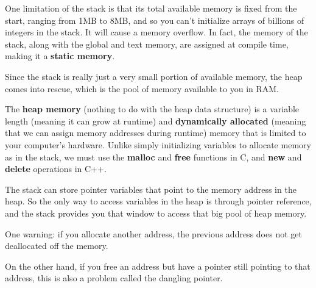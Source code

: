 \documentclass{article}
\begin{document}
    One limitation of the stack is that its total available memory is fixed from the start, ranging from 1MB to 8MB, and so you can't initialize arrays of billions of integers in the stack. It will cause a memory overflow. In fact, the memory of the stack, along with the global and text memory, are assigned at compile time, making it a \textbf{static memory}. 

    Since the stack is really just a very small portion of available memory, the heap comes into rescue, which is the pool of memory available to you in RAM. 

    \begin{definition}
      The \textbf{heap memory} (nothing to do with the heap data structure) is a variable length (meaning it can grow at runtime) and \textbf{dynamically allocated} (meaning that we can assign memory addresses during runtime) memory that is limited to your computer's hardware. Unlike simply initializing variables to allocate memory as in the stack, we must use the \textbf{malloc} and \textbf{free} functions in C, and \textbf{new} and \textbf{delete} operations in C++. 
    \end{definition}

    \begin{definition}[malloc]
      
    \end{definition}

    \begin{definition}[free]
      
    \end{definition}

    The stack can store pointer variables that point to the memory address in the heap. So the only way to access variables in the heap is through pointer reference, and the stack provides you that window to access that big pool of heap memory. 


    One warning: if you allocate another address, the previous address does not get deallocated off the memory. 

    \begin{definition}
      
    \end{definition}

    On the other hand, if you free an address but have a pointer still pointing to that address, this is also a problem called the dangling pointer. 

    \begin{definition}
      
    \end{definition}
\end{document}
